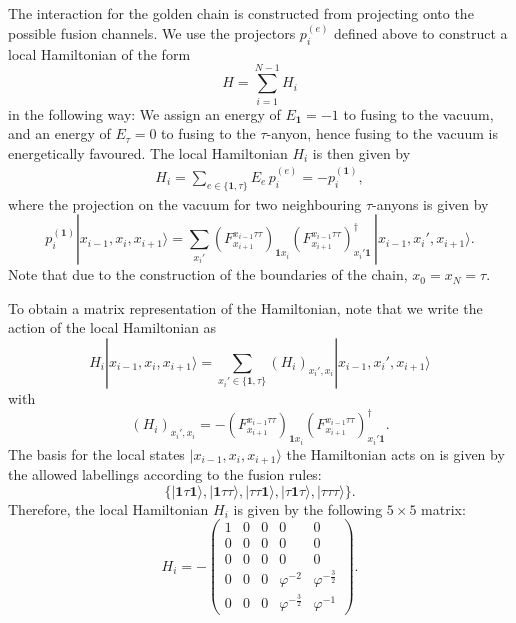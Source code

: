 \begin{exmp}
The interaction for the golden chain is constructed from projecting onto the possible fusion channels. We use the projectors $p_i^{(e)}$ defined above to construct a local Hamiltonian of the form
	\begin{equation}
		H=\sum_{i=1}^{N-1} H_i
	\end{equation}
in the following way: We assign an energy of $E_\mathbf{1}=-1$ to fusing to the vacuum, and an energy of $E_\tau=0$ to fusing to the $\tau$-anyon, hence fusing to the vacuum is energetically favoured. The local Hamiltonian $H_i$ is then given by
	\begin{align}
	\label{eq:localham}
		H_i=\sum_{e\in\{\mathbf{1},\tau\}} E_e\,p_i^{(e)}=-p_i^{(\mathbf{1})},
	\end{align}
where the projection on the vacuum for two neighbouring $\tau$-anyons is  given by
	\begin{equation}
		p_i^{(\mathbf{1})}|x_{i-1},x_i,x_{i+1}\rangle=\sum_{x_i'}\left(F_{x_{i+1}}^{x_{i-1}\tau\tau}\right)_{\mathbf{1}x_i}\left(F_{x_{i+1}}^{x_{i-1}\tau\tau}\right)^\dagger_{x_i'\mathbf{1}}\,|x_{i-1},x_i',x_{i+1}\rangle.
	\end{equation}
Note that due to the construction of the boundaries of the chain, $x_0=x_N=\tau$.

To obtain a matrix representation of the Hamiltonian, note that we write the action of the local Hamiltonian as
	\begin{equation}
		H_i|x_{i-1},x_i,x_{i+1}\rangle=\sum_{x_i'\in\{\mathbf{1},\tau\}}(H_i)_{x_i',x_i}|x_{i-1},x_i',x_{i+1}\rangle
	\end{equation}
with 
	\begin{equation}
		(H_i)_{x_i',x_i}=-\left(F_{x_{i+1}}^{x_{i-1}\tau\tau}\right)_{\mathbf{1}x_i}\left(F_{x_{i+1}}^{x_{i-1}\tau\tau}\right)^\dagger_{x_i'\mathbf{1}}.
	\end{equation}
The basis for the local states $|x_{i-1},x_i,x_{i+1}\rangle$ the Hamiltonian acts on is given by the allowed labellings according to the fusion rules:
	\begin{equation}
		\{|\mathbf{1}\tau\mathbf{1}\rangle,|\mathbf{1}\tau\tau\rangle,|\tau\tau\mathbf{1}\rangle,|\tau\mathbf{1}\tau\rangle,|\tau\tau\tau\rangle\}.
	\end{equation}
Therefore, the local Hamiltonian $H_i$ is given by the following $5\times 5$ matrix:
	\begin{equation}
		H_i=-\begin{pmatrix}
			1 & 0 & 0 & 0 & 0 \\
			0 & 0 & 0 & 0 & 0 \\
			0 & 0 & 0 & 0 & 0 \\
			0 & 0 & 0 & \varphi^{-2} & \varphi^{-\frac{3}{2}}\\
			0 & 0 & 0 & \varphi^{-\frac{3}{2}} & \varphi^{-1} 
		\end{pmatrix}.
	\end{equation}


\end{exmp}
